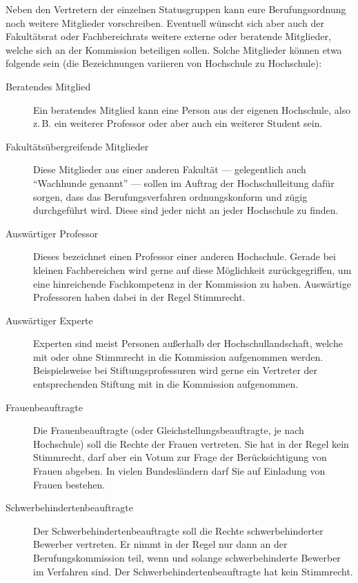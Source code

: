 \documentclass[10pt,twoside,a5paper,openright]{book}
\begin{document}
Neben den Vertretern der einzelnen Statusgruppen kann eure Berufungsordnung noch weitere Mitglieder vorschreiben. Eventuell wünscht sich aber auch der Fakultätsrat oder Fachbereichrats weitere externe oder beratende Mitglieder, welche sich an der Kommission beteiligen sollen. Solche Mitglieder können etwa folgende sein (die Bezeichnungen variieren von Hochschule zu Hochschule):

\begin{description}
	\item [Beratendes Mitglied] 
	Ein beratendes Mitglied kann eine Person aus der eigenen Hochschule, also z.\,B. ein weiterer Professor oder aber auch ein weiterer Student sein.
		
	\item [Fakultätsübergreifende Mitglieder] 
	Diese Mitglieder aus einer anderen Fakultät --- gele\-gent\-lich auch "`Wachhunde genannt"' --- sollen im Auftrag der Hochschulleitung dafür sorgen, dass das Berufungsverfahren ordnungskonform und zügig durchgeführt wird. Diese sind jeder nicht an jeder Hochschule zu finden.
		
	\item [Auswärtiger Professor] 
	Dieses bezeichnet einen Professor einer anderen Hochschule. Gerade bei kleinen Fachbereichen wird gerne auf diese Möglichkeit zurückgegriffen, um eine hinreichende Fachkompetenz in der Kommission zu haben. Auswärtige Professoren haben dabei in der Regel Stimmrecht.
		 
	\item [Auswärtiger Experte]
	Experten sind meist Personen außerhalb der Hochschullandschaft, welche mit oder ohne Stimmrecht in die Kommission aufgenommen werden. Beispielsweise bei Stiftungsprofessuren wird gerne ein Vertreter der entsprechenden Stiftung mit in die Kommission aufgenommen.
	
	\item [Frauenbeauftragte]
	Die Frauenbeauftragte (oder Gleichstellungsbeauftragte, je nach Hochschule)	soll die Rechte der Frauen vertreten. Sie hat in der Regel kein Stimmrecht, darf aber ein Votum zur Frage der Berücksichtigung von
	Frauen abgeben. In vielen Bundesländern darf Sie auf Einladung von Frauen bestehen.
	
	\item [Schwerbehindertenbeauftragte]
	Der Schwerbehindertenbeauftragte soll die Rechte schwerbehinderter Bewerber vertreten. Er nimmt in der
	Regel nur dann an der Berufungskommission teil, wenn und solange schwerbehinderte Bewerber im Verfahren
	sind. Der Schwerbehindertenbeauftragte hat kein Stimmrecht.

\end{description}
\end{document}
